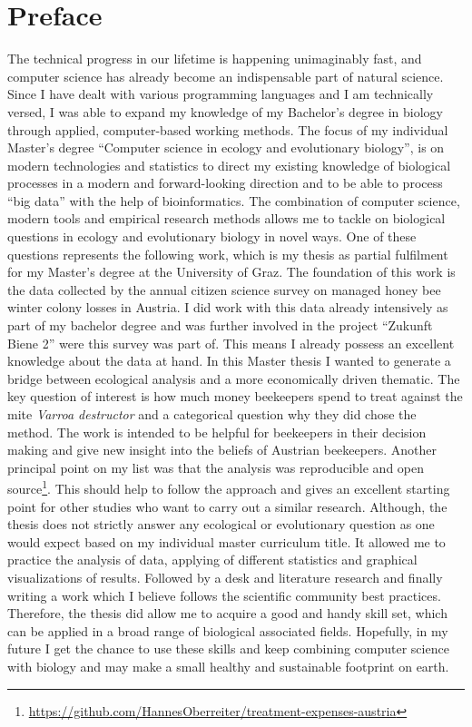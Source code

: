 \chapter*{Preface}
\label{sec:Preface}
\vspace*{-10mm}

The technical progress in our lifetime is happening unimaginably fast, and computer science has already become an indispensable part of natural science. Since I have dealt with various programming languages and I am technically versed, I was able to expand my knowledge of my Bachelor's degree in biology through applied, computer-based working methods. The focus of my individual Master's degree \enquote{Computer science in ecology and evolutionary biology}, is on modern technologies and statistics to direct my existing knowledge of biological processes in a modern and forward-looking direction and to be able to process \enquote{big data} with the help of bioinformatics. The combination of computer science, modern tools and empirical research methods allows me to tackle on biological questions in ecology and evolutionary biology in novel ways. One of these questions represents the following work, which is my thesis as partial fulfilment for my Master's degree at the University of Graz. The foundation of this work is the data collected by the annual citizen science survey on managed honey bee winter colony losses in Austria. I did work with this data already intensively as part of my bachelor degree and was further involved in the project \enquote{Zukunft Biene 2} were this survey was part of. This means I already possess an excellent knowledge about the data at hand. In this Master thesis I wanted to generate a bridge between ecological analysis and a more economically driven thematic. The key question of interest is how much money beekeepers spend to treat against the mite \textit{Varroa destructor} and a categorical question why they did chose the method. The work is intended to be helpful for beekeepers in their decision making and give new insight into the beliefs of Austrian beekeepers. Another principal point on my list was that the analysis was reproducible and open source\footnote{\url{https://github.com/HannesOberreiter/treatment-expenses-austria}}. This should help to follow the approach and gives an excellent starting point for other studies who want to carry out a similar research. Although, the thesis does not strictly answer any ecological or evolutionary question as one would expect based on my individual master curriculum title. It allowed me to practice the analysis of data, applying of different statistics and graphical visualizations of results. Followed by a desk and literature research and finally writing a work which I believe follows the scientific community best practices. Therefore, the thesis did allow me to acquire a good and handy skill set, which can be applied in a broad range of biological associated fields. Hopefully, in my future I get the chance to use these skills and keep combining computer science with biology and may make a small healthy and sustainable footprint on earth.